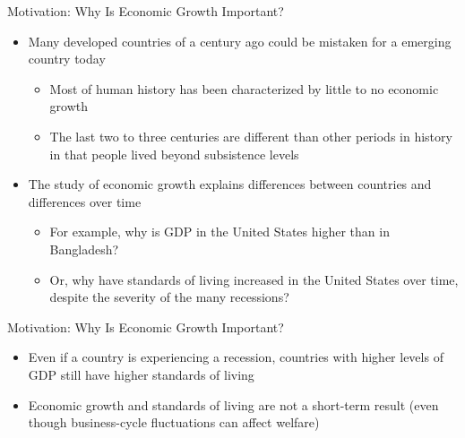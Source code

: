 \documentclass[aspectratio=1610]{beamer}
\begin{document}
\begin{frame}[wide]{Motivation: Why Is Economic Growth Important?}
	\begin{itemize}
		\item Many developed countries of a century ago could be mistaken for a emerging country today
		\begin{itemize}
			\item Most of human history has been characterized by little to no economic growth
			\item The last two to three centuries are different than other periods in history in that people lived beyond subsistence levels
		\end{itemize}
		\item 	The study of economic growth explains differences between countries and differences over time
		\begin{itemize}
			\item For example, why is GDP in the United States higher than in Bangladesh?
			\item Or, why have standards of living increased in the United States over time, despite the severity of the many recessions?
		\end{itemize}
	
	\end{itemize}
\end{frame}

\begin{frame}[wide]{Motivation: Why Is Economic Growth Important?}
	\begin{itemize}
		\item 	Even if a country is experiencing a recession, countries with higher levels of GDP still have higher standards of living
		\vspace{3mm}
		\item Economic growth and standards of living are not a short-term result (even though business-cycle fluctuations can affect welfare)
		
	\end{itemize}
\end{frame}
\end{document}
